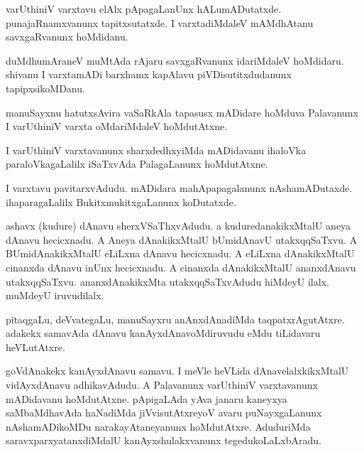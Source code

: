 \documentclass{article}
\begin{document}
\begin{mn}%
varUthiniV varxtavu elAlx pApagaLanUnx hALumADutatxde. punajaRnamxvanunx tapitxsutatxde. I 
varxtadiMdaleV mAMdhAtanu savxgaRvanunx hoMdidanu.
\end{mn}

\begin{mn}%
duMdhumAraneV muMtAda rAjaru savxgaRvanunx idariMdaleV hoMdidaru. shivanu I varxtamADi barxhamx 
kapAlavu piVDisutitxdudanunx tapipxsikoMDanu.
\end{mn}

\begin{mn}%
manuSayxnu hatutxsAvira vaSaRkAla tapasusx mADidare hoMduva Palavanunx I varUthiniV varxta 
oMdariMdaleV hoMdutAtxne.
\end{mn}

\begin{mn}%
I varUthiniV varxtavanunx sharxdedhxyiMda mADidavanu ihaloVka paraloVkagaLalilx iSaTxvAda 
PalagaLanunx hoMdutAtxne.
\end{mn}

\begin{mn}%
I varxtavu pavitarxvAdudu. mADidara mahApapagalanunx nAshamADutaxde. ihaparagaLalilx 
BukitxmukitxgaLanunx koDutatxde.
\end{mn}

\begin{mn}%
ashavx (kudure) dAnavu sherxVSaThxvAdudu. a kuduredanakikxMtalU aneya dAnavu hecicxnadu. A Aneya 
dAnakikxMtalU bUmidAnavU utakxqqSaTxvu. A BUmidAnakikxMtalU eLiLxna dAnavu hecicxnadu. A eLiLxna 
dAnakikxMtalU cinanxda dAnavu inUnx hecicxnadu. A cinanxda dAnakikxMtalU ananxdAnavu 
utakxqqSaTxvu. ananxdAnakikxMta utakxqqSaTxvAdudu hiMdeyU ilalx. muMdeyU iruvudilalx.
\end{mn}

\begin{mn}%
pitaqgaLu, deVvategaLu, manuSayxru anAnxdAnadiMda taqpatxrAgutAtxre. adakekx samavAda dAnavu 
kanAyxdAnavoMdiruvudu eMdu tiLidavaru heVLutAtxre.
\end{mn}

\begin{mn}%
goVdAnakekx kanAyxdAnavu samavu. I meVle heVLida dAnavelalxkikxMtalU vidAyxdAnavu adhikavAdudu. A 
Palavanunx varUthiniV varxtavanunx mADidavanu hoMdutAtxne. pApigaLAda yAva janaru kaneyxya 
saMbaMdhavAda haNadiMda jiVvisutAtxreyoV avaru puNayxgaLanunx nAshamADikoMDu narakayAtaneyanunx 
hoMdutAtxre. AduduriMda saravxparxyatanxdiMdalU kanAyxshulakxvanunx tegedukoLaLxbAradu.
\end{mn}
\end{document}
